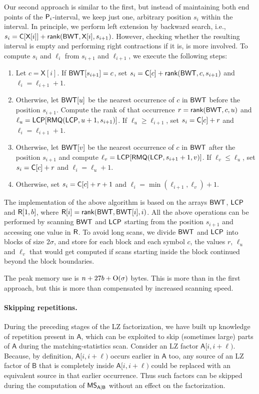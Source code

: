 \documentclass[runningheads]{llncs}
\def\BWT{\mbox{\rm L}}
\def\rank{\textsf{rank}}
\def\X{\textsf{X}}
\def\MS{\mbox{\rm {\sf MS}}}
\def\B{\textsf{B}}
\def\A{\textsf{A}}
\def\Pr{\mbox{\rm {\sf P}}}
\def\R{\mbox{\rm {\sf R}}}
\def\C{\mbox{\rm {\sf C}}}
\def\BWT{\mbox{\rm {\sf BWT}}}
\def\LCP{\mbox{\rm {\sf LCP}}}
\def\RMQ{\mbox{\rm {\sf RMQ}}}
\def\O{\mbox{\rm O}}
\begin{document}
Our second approach is similar to the first, but instead of
maintaining both end points of the $\Pr_i$-interval, we keep just one,
arbitrary position $s_i$ within the interval. In principle, we perform
left extension by backward search, i.e.,
$s_i=\C[\X[i]]+\rank(\BWT,\X[i],s_{i+1})$. However, checking whether
the resulting interval is empty and performing right contractions if
it is, is more involved. To compute $s_i$ and $\ell_i$ from
$s_{i+1}$ and $\ell_{i+1}$, we execute the following steps:
\begin{enumerate}
\item Let $c=\X[i]$. If $\BWT[s_{i+1}]=c$, set
  $s_i=\C[c]+\rank(\BWT,c,s_{i+1})$ and $\ell_i=\ell_{i+1}+1$. 
\item Otherwise, let $\BWT[u]$ be the nearest occurrence of $c$ in
  $\BWT$ before the position $s_{i+1}$. Compute the rank of that
  occurrence $r=\rank(\BWT,c,u)$ and $\ell_u=\LCP[\RMQ(\LCP,u+1,s_{i+1})]$. If
  $\ell_u\ge \ell_{i+1}$, set $s_i=\C[c]+r$ and
  $\ell_i=\ell_{i+1}+1$. 
\item Otherwise, let $\BWT[v]$ be the nearest occurrence of $c$ in
  $\BWT$ after the position $s_{i+1}$ and compute
  $\ell_v=\LCP[\RMQ(\LCP,s_{i+1}+1,v)]$. If $\ell_v \le \ell_u$, set
  $s_i=\C[c]+r$ and $\ell_i=\ell_u+1$.
\item Otherwise, set $s_i=\C[c]+r+1$ and $\ell_i=\min(\ell_{i+1},\ell_v)+1$.
\end{enumerate}

The implementation of the above algorithm is based on the arrays
$\BWT$, $\LCP$ and $\R[1,b]$, where $\R[i]=\rank(\BWT,\BWT[i],i)$.
All the above operations can be performed by scanning $\BWT$ and
$\LCP$ starting from the position $s_{i+1}$ and accessing one value in
$\R$. To avoid long scans, we divide $\BWT$ and $\LCP$ into blocks of
size $2\sigma$, and store for each block and each symbol $c$, the
values $r$, $\ell_u$ and $\ell_v$ that would get computed if scans
starting inside the block continued beyond the block boundaries.

The peak memory use is $n+27b+\O(\sigma)$
bytes. This is more than in the first approach, but this is more than
compensated by increased scanning speed.

\paragraph{Skipping repetitions.}

During the preceding stages of the LZ factorization, we have 
built up knowledge of repetition present in $\A$, which can be
exploited to skip (sometimes large) parts of $\A$ during the
matching-statistics scan.
Consider an LZ factor $\A[i,i+\ell)$. 
Because, by definition, $\A[i,i+\ell)$ occurs earlier in $\A$ too, any
source of an LZ factor of $\B$ that is completely inside $\A[i,i+\ell)$
could be replaced with an equivalent source in that earlier
occurrence.  Thus such factors can be skipped during the computation
of $\MS_{\A|\B}$ without an effect on the factorization.
\end{document}
